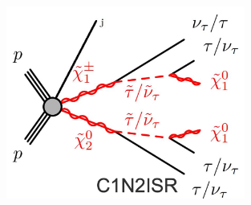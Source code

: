 \documentclass[usenames,dvipsnames]{beamer}
\begin{document}
\begin{frame}
\begin{columns}
    \raggedleft
    \begin{figure}
    \includegraphics[width = 0.7\textwidth]{graphics/Feynman diagram.png}
    \end{figure}
 \end{columns}

\end{frame}
\end{document}
